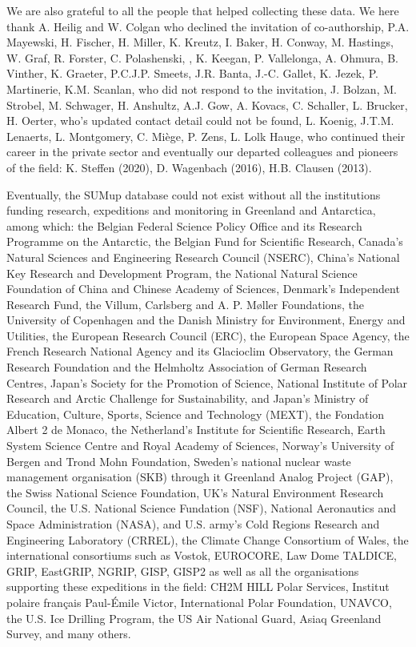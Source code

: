 \documentclass[journal abbreviation, manuscript]{copernicus}
\begin{document}
\bigskip

We are also grateful to all the people that helped collecting these data. We here thank A. Heilig and W. Colgan who declined the invitation of co-authorship, P.A. Mayewski, H. Fischer, H. Miller, K. Kreutz, I. Baker, H. Conway, M. Hastings, W. Graf, R. Forster, C. Polashenski, , K. Keegan, P. Vallelonga, A. Ohmura, B. Vinther, K. Graeter, P.C.J.P. Smeets, J.R. Banta, J.-C. Gallet, K. Jezek, P. Martinerie, K.M. Scanlan, who did not respond to the invitation, J. Bolzan, M. Strobel, M. Schwager, H. Anshultz, A.J. Gow, A. Kovacs, C. Schaller, L. Brucker, H. Oerter, who's updated contact detail could not be found, L. Koenig, J.T.M. Lenaerts, L. Montgomery, C. Miège, P. Zens, L. Lolk Hauge, who continued their career in the private sector and eventually our departed colleagues and pioneers of the field: K. Steffen (2020), D. Wagenbach (2016), H.B. Clausen (2013).

\bigskip

Eventually, the SUMup database could not exist without all the institutions funding research, expeditions and monitoring in Greenland and Antarctica, among which: the Belgian Federal Science Policy Office and its Research Programme on the Antarctic, the Belgian Fund for Scientific Research, Canada's Natural Sciences and Engineering Research Council (NSERC), China's National Key Research and Development Program, the National Natural Science Foundation of China and Chinese Academy of Sciences, Denmark's Independent Research Fund, the Villum, Carlsberg and A. P. Møller Foundations, the University of Copenhagen and the Danish Ministry for Environment, Energy and Utilities, the European Research Council (ERC), the European Space Agency, the French Research National Agency and its Glacioclim Observatory, the German Research Foundation and the Helmholtz Association of German Research Centres, Japan's Society for the Promotion of Science, National Institute of Polar Research and Arctic Challenge for Sustainability, and Japan's Ministry of Education, Culture, Sports, Science and Technology (MEXT), the Fondation Albert 2 de Monaco, the Netherland's Institute for Scientific Research, Earth System Science Centre and Royal Academy of Sciences, Norway's University of Bergen and Trond Mohn Foundation, Sweden's national nuclear waste management organisation (SKB) through it Greenland Analog Project (GAP), the Swiss National Science Foundation, UK's Natural Environment Research Council, the U.S. National Science Fundation (NSF), National Aeronautics and Space Administration (NASA), and U.S. army's Cold Regions Research and Engineering Laboratory (CRREL), the Climate Change Consortium of Wales, the international consortiums such as Vostok, EUROCORE, Law Dome TALDICE, GRIP, EastGRIP, NGRIP, GISP, GISP2 as well as all the organisations supporting these expeditions in the field: CH2M HILL Polar Services, Institut polaire français Paul-Émile Victor, International Polar Foundation, UNAVCO, the U.S. Ice Drilling Program, the US Air National Guard, Asiaq Greenland Survey, and many others.
\end{document}
